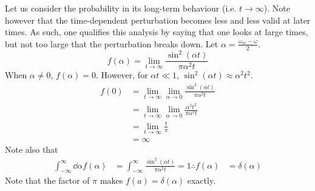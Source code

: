 \documentclass[12pt,a4paper,titlepage]{article}
\begin{document}
Let us consider the probability in its long-term behaviour (i.e. $t\rightarrow\infty$). Note however that the time-dependent perturbation becomes less and less valid at later times. As such, one qualifies this analysis by saying that one looks at large times, but not too large that the perturbation breaks down. Let $\alpha=\frac{\omega_{ni}-\omega}{2}$.
\begin{equation}
f(\alpha)=\lim_{t\rightarrow\infty}\frac{\sin^{2}(\alpha t)}{\pi\alpha^{2}t}
\end{equation}
When $\alpha\neq0$, $f(\alpha)=0$. However, for $\alpha t\ll 1$, $\sin^{2}(\alpha t)\approx \alpha^{2}t^{2}$.
\begin{equation}
\begin{aligned}
f(0)&=\lim_{t\rightarrow\infty}\lim_{\alpha\rightarrow0}\frac{\sin^{2}(\alpha t)}{\pi\alpha^{2}t}\\
&=\lim_{t\rightarrow\infty}\lim_{\alpha\rightarrow0}\frac{\alpha^{2}t^{2}}{\pi\alpha^{2}t}\\
&=\lim_{t\rightarrow\infty}\frac{t}{\pi}\\
&=\infty
\end{aligned}
\end{equation}
Note also that
\begin{equation}
\begin{aligned}
\int_{-\infty}^{\infty}\dd{\alpha}f(\alpha)&=\int_{-\infty}^{\infty}\frac{\sin^{2}(\alpha t)}{\pi\alpha^{2}t}=1
\therefore f(\alpha)&=\delta(\alpha)
\end{aligned}
\end{equation}
Note that the factor of $\pi$ makes $f(a)=\delta(\alpha)$ exactly.\\
\end{document}

